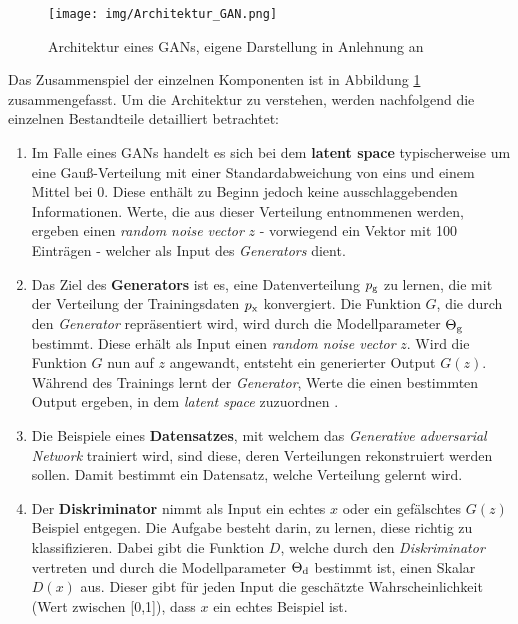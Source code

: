 \begin{figure}[H]
	\centering
	\texttt{[image: img/Architektur\_GAN.png]}
	\caption{Architektur eines GANs, eigene Darstellung in Anlehnung an \cite[S. 37]{5}}
	\label{fig:architektur}
\end{figure}

Das Zusammenspiel der einzelnen Komponenten ist in Abbildung \ref{fig:architektur} zusammengefasst. Um die Architektur zu verstehen, werden nachfolgend die einzelnen Bestandteile detailliert betrachtet:

\begin{enumerate}
	\item Im Falle eines GANs handelt es sich bei dem \textbf{latent space} typischerweise um eine Gauß-Verteilung mit einer Standardabweichung von eins und einem Mittel bei 0. Diese enthält zu Beginn jedoch keine ausschlaggebenden Informationen. 
	Werte, die aus dieser Verteilung entnommenen werden, ergeben einen \textit{random noise vector} $z$ -  vorwiegend ein Vektor mit 100 Einträgen - welcher als Input des \textit{Generators} dient.
	\cite[vgl.][S. 18, S. 37]{5} \cite[vgl.][]{34}
	
	\item Das Ziel des \textbf{Generators} ist es, eine Datenverteilung $p\textsubscript{g}$ zu lernen, die mit der Verteilung der Trainingsdaten $p\textsubscript{x}$ konvergiert. Die Funktion $G$, die durch den \textit{Generator} repräsentiert wird, wird durch die Modellparameter $\Theta\textsubscript{g}$ bestimmt. Diese erhält als Input einen \textit{random noise vector} $z$. Wird die Funktion $G$ nun auf $z$ angewandt, entsteht ein generierter Output $G(z)$. 
	Während des Trainings lernt der \textit{Generator}, Werte die einen bestimmten Output ergeben, in dem \textit{latent space} zuzuordnen \cite{34}.\cite[vgl.][S.5, S. 37]{5}
	
	\item Die Beispiele eines \textbf{Datensatzes}, mit welchem das \textit{Generative adversarial Network} trainiert wird, sind diese, deren Verteilungen rekonstruiert werden sollen. Damit bestimmt ein Datensatz, welche Verteilung gelernt wird. \cite[vgl.][S. 7]{5}

	\item Der \textbf{Diskriminator} nimmt als Input ein echtes $x$ oder ein gefälschtes $G(z)$ Beispiel entgegen. Die Aufgabe besteht darin, zu lernen, diese richtig zu klassifizieren. Dabei gibt die Funktion $D$, welche durch den \textit{Diskriminator} vertreten und durch die Modellparameter $\Theta\textsubscript{d}$ bestimmt ist, einen Skalar $D(x)$ aus. Dieser gibt für jeden Input die geschätzte Wahrscheinlichkeit (Wert zwischen [0,1]), dass $x$ ein echtes Beispiel ist.  \cite[vgl.][S. 1f.]{4}


\end{enumerate}
